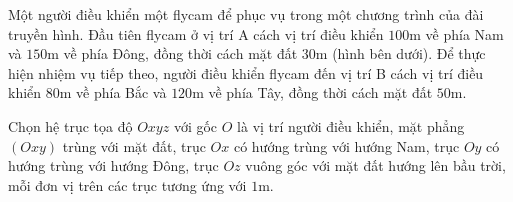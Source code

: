 \begin{bt}
{{}}
\end{bt}

\begin{bt}%
Một người điều khiển một flycam để phục vụ trong một chương trình của đài truyền hình. Đầu tiên flycam ở vị trí A cách vị trí điều khiển $100$m về phía Nam và $150$m về phía Đông, đồng thời cách mặt đất $30$m (hình bên dưới). Để thực hiện nhiệm vụ tiếp theo, người điều khiển flycam đến vị trí B cách vị trí điều khiển $80$m về phía Bắc và $120$m về phía Tây, đồng thời cách mặt đất $50$m.

Chọn hệ trục tọa độ $Oxyz$ với gốc $O$ là vị trí người điều khiển, mặt phẳng $(Oxy)$ trùng với mặt đất, trục $Ox$ có hướng trùng với hướng Nam, trục $Oy$ có hướng trùng với hướng Đông, trục $Oz$ vuông góc với mặt đất hướng lên bầu trời, mỗi đơn vị trên các trục tương ứng với $1$m.


\end{bt}
